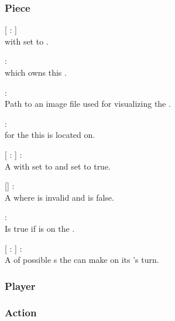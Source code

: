 \subsubsection{Piece}
\begin{dlist}
  \item {}[  :  ]\\
   with  set to .
  
  \item {} : \\
   which owns this .
  
  \item {} : \\
  Path to an image file used for visualizing the .
  
  \item {} : \\
   for the  this  is located on.
  
  \item {}[  :  ] : \\
  A  with  set to  and  set to true.
  
  \item {}[] : \\
  A  where  is invalid and  is false.
  
  \item {} : \\
  Is true if  is on the .
  
  \item {}[  :  ] : \\
  A  of possible s the  can make on its 's turn.
\end{dlist}

\subsubsection{Player}

\subsubsection{Action}

